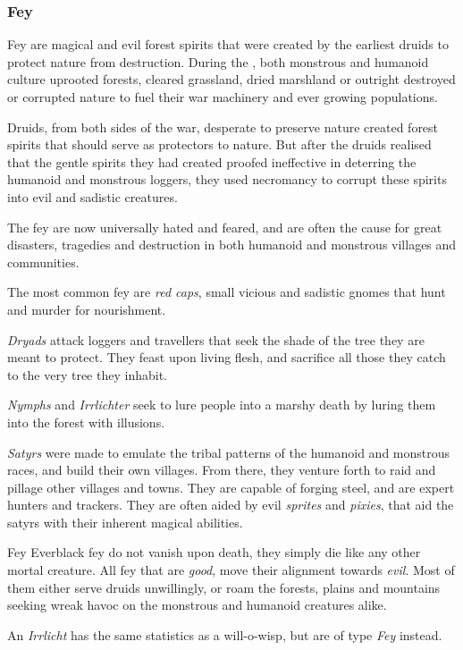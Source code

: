 \subsubsection{Fey}
\label{sec:Fey}

Fey are magical and evil forest spirits that were created by the earliest druids
to protect nature from destruction. During the ,
both monstrous and humanoid culture uprooted forests, cleared grassland, dried
marshland or outright destroyed or corrupted nature to fuel their war
machinery and ever growing populations.

Druids, from both sides of the war, desperate to preserve nature created
forest spirits that should serve as protectors to nature. But after the druids
realised that the gentle spirits they had created proofed ineffective in
deterring the humanoid and monstrous loggers, they used necromancy to corrupt
these spirits into evil and sadistic creatures.

The fey are now universally hated and feared, and are often the cause for great
disasters, tragedies and destruction in both humanoid and monstrous villages
and communities.

The most common fey are \emph{red caps}, small vicious and sadistic gnomes
that hunt and murder for nourishment.

\emph{Dryads} attack loggers and travellers that seek the shade of the tree
they are meant to protect. They feast upon living flesh, and sacrifice all
those they catch to the very tree they inhabit.

\emph{Nymphs} and \emph{Irrlichter} seek to lure people into a marshy death by
luring them into the forest with illusions.

\emph{Satyrs} were made to emulate the tribal patterns of the humanoid and
monstrous races, and build their own villages. From there, they venture forth
to raid and pillage other villages and towns. They are capable of forging
steel, and are expert hunters and trackers. They are often aided by evil
\emph{sprites} and \emph{pixies}, that aid the satyrs with their inherent
magical abilities.

\begin{35e}{Fey}
  Everblack fey do not vanish upon death, they simply die like any other
  mortal creature. All fey that are \emph{good}, move their alignment towards
  \emph{evil}. Most of them either serve druids unwillingly, or roam the
  forests, plains and mountains seeking wreak havoc on the monstrous and
  humanoid creatures alike.

  An \emph{Irrlicht} has the same statistics as a will-o-wisp, but are of
  type \emph{Fey} instead.
\end{35e}
